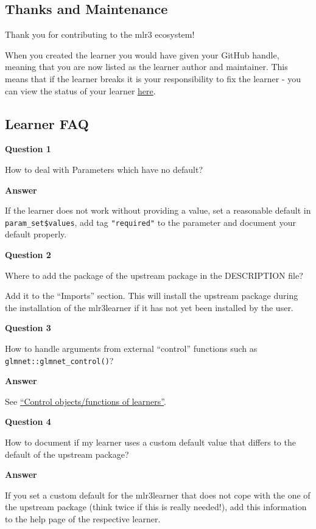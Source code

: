 \documentclass[
]{scrbook}
\begin{document}
\hypertarget{thanks-and-maintenance}{%
\subsection{Thanks and Maintenance}\label{thanks-and-maintenance}}

Thank you for contributing to the mlr3 ecosystem!

When you created the learner you would have given your GitHub handle, meaning that you are now listed as the learner author and maintainer. This means that if the learner breaks it is your responsibility to fix the learner - you can view the status of your learner \href{https://mlr3extralearners.mlr-org.com/articles/learners/learner_status.html}{here}.

\hypertarget{learner-faq}{%
\subsection{Learner FAQ}\label{learner-faq}}

\textbf{Question 1}

How to deal with Parameters which have no default?

\textbf{Answer}

If the learner does not work without providing a value, set a reasonable default in \texttt{param\_set\$values}, add tag \texttt{"required"} to the parameter and document your default properly.

\textbf{Question 2}

Where to add the package of the upstream package in the DESCRIPTION file?

Add it to the ``Imports'' section.
This will install the upstream package during the installation of the mlr3learner if it has not yet been installed by the user.

\textbf{Question 3}

How to handle arguments from external ``control'' functions such as \texttt{glmnet::glmnet\_control()}?

\textbf{Answer}

See \href{https://mlr3book.mlr-org.com/extending-learners.html\#learner-control}{``Control objects/functions of learners''}.

\textbf{Question 4}

How to document if my learner uses a custom default value that differs to the default of the upstream package?

\textbf{Answer}

If you set a custom default for the mlr3learner that does not cope with the one of the upstream package (think twice if this is really needed!), add this information to the help page of the respective learner.
\end{document}

